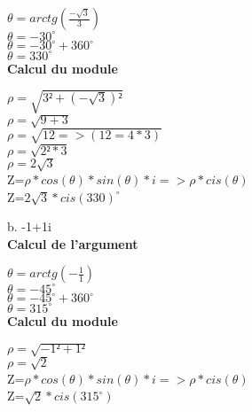 $\theta = arctg(\frac{-\sqrt{3}} {3})$ \\
$\theta = -30^{\circ}$ \\
$\theta = -30^{\circ} + 360^{\circ}$ \\
$\theta = 330^{\circ}$ \\

\textbf{Calcul du module} \\
\vspace{3mm} %

$\rho = \sqrt{3²+(-\sqrt{3})²}$ \\
$\rho = \sqrt{9+3}$ \\
$\rho = \sqrt{12 => (12=4*3)}$ \\
$\rho = \sqrt{2²*3}$ \\
$\rho = 2\sqrt{3}$ \\

Z=$\rho * cos(\theta)*sin(\theta)*i => \rho * cis(\theta)$ \\

Z=$ 2\sqrt{3} * cis(330)^{\circ} $ \\

\vspace{5mm} %

b.  -1+1i \\

\textbf{Calcul de l'argument} \\
\vspace{3mm} %

$\theta = arctg(-\frac{1} {1})$ \\
$\theta = -45^{\circ}$ \\
$\theta = -45^{\circ} + 360^{\circ}$ \\
$\theta = 315^{\circ}$ \\

\textbf{Calcul du module} \\
\vspace{3mm} %

$\rho = \sqrt{-1²+1²}$ \\
$\rho = \sqrt{2}$ \\

Z=$\rho * cos(\theta)*sin(\theta)*i => \rho * cis(\theta)$ \\

Z=$ \sqrt{2} * cis(315^{\circ}) $ \\

\newpage

\vspace{3mm} %
